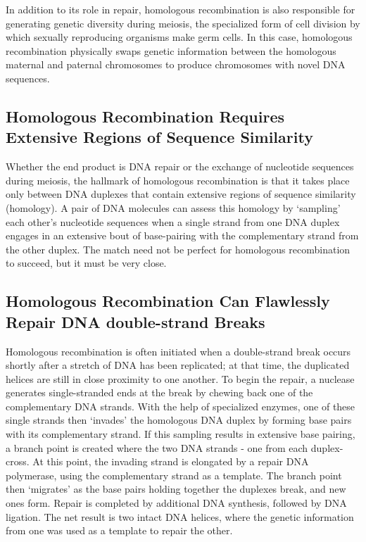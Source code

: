 In addition to its role in repair, homologous recombination is also responsible
for generating genetic diversity during meiosis, the specialized form
of cell division by which sexually reproducing organisms make germ cells.
In this case, homologous recombination physically swaps genetic information
between the homologous maternal and paternal chromosomes to
produce chromosomes with novel DNA sequences.

\subsection{Homologous Recombination Requires Extensive Regions of Sequence Similarity}

Whether the end product is DNA repair or the exchange of nucleotide
sequences during meiosis, the hallmark of homologous recombination
is that it takes place only between DNA duplexes that contain extensive
regions of sequence similarity (homology). A pair of DNA molecules can
assess this homology by ‘sampling’ each other’s nucleotide sequences
when a single strand from one DNA duplex engages in an extensive bout
of base-pairing with the complementary strand from the other duplex.
The match need not be perfect for homologous recombination to succeed, but it must be very close.


\subsection{Homologous Recombination Can Flawlessly Repair DNA double-strand Breaks}

Homologous recombination is often initiated when a double-strand break
occurs shortly after a stretch of DNA has been replicated; at that time,
the duplicated helices are still in close proximity to one another.
To begin the repair, a nuclease generates single-stranded ends
at the break by chewing back one of the complementary DNA strands.
With the help of specialized enzymes, one of these single strands then ‘invades’
the homologous DNA duplex by forming base
pairs with its complementary strand. If this sampling results in extensive
base pairing, a branch point is created where the two DNA strands - one
from each duplex-cross. At this point, the invading strand
is elongated by a repair DNA polymerase, using the complementary
strand as a template. The branch point then ‘migrates’
as the base pairs holding together the duplexes break, and new ones
form. Repair is completed by additional DNA synthesis,
followed by DNA ligation. The net result is two intact DNA
helices, where the genetic information from one was used as a template
to repair the other.


